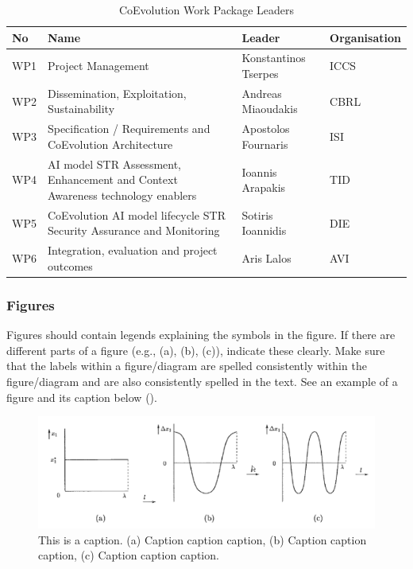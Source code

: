 \begin{table}[htb]
	\centering
	\caption{CoEvolution Work Package Leaders}
	\label{tab:work_package_leaders}
      \def\arraystretch{1.25}	
       \begin{tabular}{|l|>{\raggedright}p{6.5cm}|p{3.8cm}|p{2.2cm}|}
		\hline
		\rowcolor{gray!30} %
		No & Name & Leader & Organisation \\
	    \hline
    	     WP1 & Project Management & Konstantinos Tserpes & ICCS  \\ \hline
    	     WP2 & Dissemination, Exploitation, Sustainability  & Andreas Miaoudakis  & CBRL \\ \hline
    	     WP3 & Specification / Requirements and CoEvolution
Architecture & Apostolos Fournaris  & ISI \\ \hline
    	     WP4 & AI model STR Assessment, Enhancement and
Context Awareness technology enablers & Ioannis Arapakis & TID \\ \hline
              WP5 & CoEvolution AI model lifecycle STR Security
Assurance and Monitoring & Sotiris Ioannidis & DIE  \\ \hline
    	     WP6 & Integration, evaluation and project outcomes & Aris Lalos & AVI \\ \hline
	\end{tabular}
\end{table}


\subsubsection{Figures}
\label{sec:figures}

Figures should contain legends explaining the symbols in the figure. If there are different parts of a figure (e.g., (a), (b), (c)), indicate these clearly. Make sure that the labels within a figure/diagram are spelled consistently within the figure/diagram and are also consistently spelled in the text. See an example of a figure and its caption below ().

\begin{figure}[htb]
	\centering
	\includegraphics[width=.89\linewidth]{graphics/figure}
	\caption{This is a caption. (a) Caption caption caption, (b) Caption caption caption, (c) Caption caption caption.}
	\label{fig:figure}
\end{figure}

